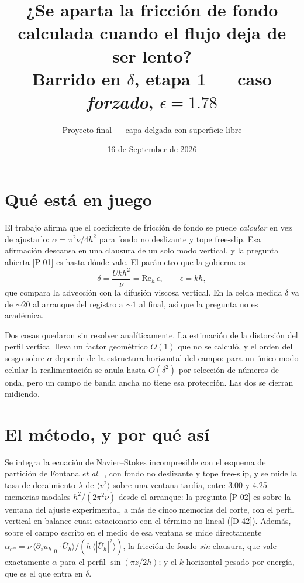 \documentclass[11pt,a4paper]{article}
\title{¿Se aparta la fricción de fondo calculada cuando el flujo deja de ser lento?\\
\large Barrido en $\delta$, etapa 1 --- caso \emph{forzado}, $\epsilon = 1.78$}
\author{Proyecto final --- capa delgada con superficie libre}
\date{16 de September de 2026}
\begin{document}
\maketitle

\section{Qué está en juego}

El trabajo afirma que el coeficiente de fricción de fondo se puede \emph{calcular} en vez
de ajustarlo: $\alpha = \pi^2\nu/4h^2$ para fondo no deslizante y tope free-slip. Esa
afirmación descansa en una clausura de un solo modo vertical, y la pregunta abierta
[P-01] es hasta dónde vale. El parámetro que la gobierna es
\begin{equation}
  \delta = \frac{U k h^2}{\nu} = \mathrm{Re}_h\,\epsilon , \qquad \epsilon = k h ,
\end{equation}
que compara la advección con la difusión viscosa vertical. En la celda medida $\delta$ va
de $\sim 20$ al arranque del registro a $\sim 1$ al final, así que la pregunta no es
académica.

Dos cosas quedaron sin resolver analíticamente. La estimación de la distorsión del perfil
vertical lleva un factor geométrico $O(1)$ que no se calculó, y el orden del sesgo sobre
$\alpha$ depende de la estructura horizontal del campo: para un único modo celular la
realimentación se anula hasta $O(\delta^2)$ por selección de números de onda, pero un
campo de banda ancha no tiene esa protección. Las dos se cierran midiendo.

\section{El método, y por qué así}

Se integra la ecuación de Navier--Stokes incompresible con el esquema de partición de
Fontana \emph{et al.}~\cite{fontana2020}, con fondo no deslizante y tope free-slip,
y se mide la tasa de decaimiento $\lambda$ de $\langle v^2\rangle$ sobre una ventana
tardía, entre 3.00 y 4.25 memorias modales $h^2/(2\pi^2\nu)$ desde el arranque:
la pregunta [P-02] es sobre la ventana del ajuste experimental, a más de cinco memorias
del corte, con el perfil vertical en balance cuasi-estacionario con el término no lineal
([D-42]). Además, sobre el campo escrito en el medio de esa ventana se mide directamente
$\alpha_\text{eff} = \nu\,\langle \partial_z u_h|_0 \cdot \bar U_h\rangle / (h\,\langle|\bar U_h|^2\rangle)$,
la fricción de fondo \emph{sin} clausura, que vale exactamente $\alpha$ para el perfil
$\sin(\pi z/2h)$; y el $k$ horizontal pesado por energía, que es el que entra en $\delta$.
\end{document}
